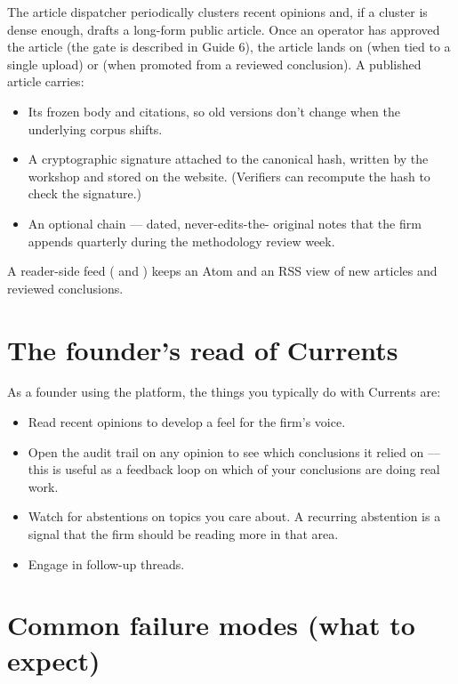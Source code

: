 \documentclass[11pt]{article}
\begin{document}
The article dispatcher periodically clusters recent opinions and, if
a cluster is dense enough, drafts a long-form public article. Once an
operator has approved the article (the gate is described in Guide 6),
the article lands on  (when tied to a single
upload) or  (when promoted from a
reviewed conclusion). A published article carries:

\begin{itemize}[leftmargin=*,itemsep=0.2em]
  \item Its frozen body and citations, so old versions don't change
        when the underlying corpus shifts.
  \item A cryptographic signature attached to the canonical hash,
        written by the workshop and stored on the website. (Verifiers
        can recompute the hash to check the signature.)
  \item An optional  chain --- dated, never-edits-the-
        original notes that the firm appends quarterly during the
        methodology review week.
\end{itemize}

A reader-side feed ( and ) keeps an
Atom and an RSS view of new articles and reviewed conclusions.

\section{The founder's read of Currents}

As a founder using the platform, the things you typically do with
Currents are:

\begin{itemize}[leftmargin=*,itemsep=0.2em]
  \item Read recent opinions to develop a feel for the firm's voice.
  \item Open the audit trail on any opinion to see which conclusions
        it relied on --- this is useful as a feedback loop on which
        of your conclusions are doing real work.
  \item Watch for abstentions on topics you care about. A recurring
        abstention is a signal that the firm should be reading more
        in that area.
  \item Engage in follow-up threads.
\end{itemize}

\section{Common failure modes (what to expect)}
\end{document}

